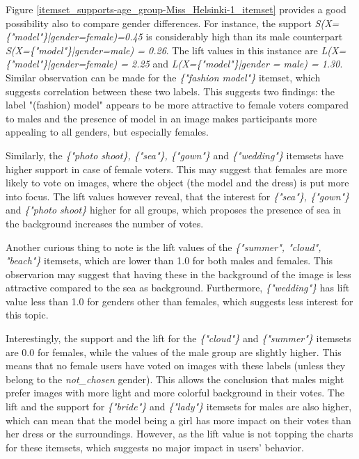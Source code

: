 Figure \ref{itemset_supports-age_group-Miss_Helsinki-1_itemset} provides a good possibility also to compare gender differences. For instance, the support \emph{S(X=\{"model"\}|gender=female)=0.45} is considerably high than its male counterpart \emph{S(X=\{"model"\}|gender=male) = 0.26}. The lift values in this instance are \emph{L(X=\{"model"\}|gender=female) = 2.25} and \emph{L(X=\{"model"\}|gender = male) = 1.30}. Similar observation can be made for the \emph{\{"fashion model"\}} itemset, which suggests correlation between these two labels. This suggests two findings: the label "(fashion) model" appears to be more attractive to female voters compared to males and the presence of model in an image makes participants more appealing to all genders, but especially females. 

Similarly, the \emph{\{"photo shoot\}, \{"sea"\}, \{"gown"\}} and \emph{\{"wedding"\}} itemsets have higher support in case of female voters. This may suggest that females are more likely to vote on images, where the object (the model and the dress) is put more into focus. The lift values however reveal, that the interest for \emph{\{"sea"\}, \{"gown"\}} and \emph{\{"photo shoot\}} higher for all groups, which proposes the presence of sea in the background increases the number of votes. 

Another curious thing to note is the lift values of the \emph{\{"summer", "cloud", "beach"\}} itemsets, which are lower than 1.0 for both males and females. This observarion may suggest that having these in the background of the image is less attractive compared to the sea as background. Furthermore, \emph{\{"wedding"\}} has lift value less than 1.0 for genders other than females, which suggests less interest for this topic.  

Interestingly, the support and the lift for the \emph{\{"cloud"\}} and \emph{\{"summer"\}} itemsets are 0.0 for females, while the values of the male group are slightly higher. This means that no female users have voted on images with these labels (unless they belong to the \emph{not\_chosen} gender). This allows the conclusion that males might prefer images with more light and more colorful background in their votes. The lift and the support for \emph{\{"bride"\}} and \emph{\{"lady"\}} itemsets for males are also higher, which can mean that the model being a girl has more impact on their votes than her dress or the surroundings. However, as the lift value is not topping the charts for these itemsets, which suggests no major impact in users' behavior.

